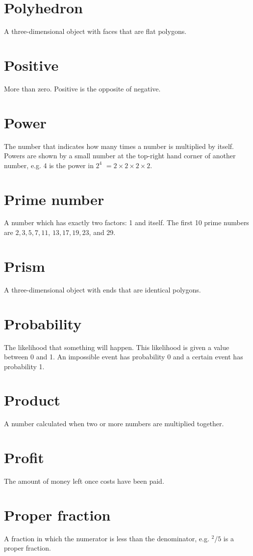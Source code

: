 \documentclass[10pt]{article}
\begin{document}
\section*{Polyhedron}
A three-dimensional object with faces that are flat polygons.

\section*{Positive}
More than zero. Positive is the opposite of negative.

\section*{Power}
The number that indicates how many times a number is multiplied by itself. Powers are shown by a small number at the top-right hand corner of another number, e.g. 4 is the power in $2^{4}$ $=2 \times 2 \times 2 \times 2$.

\section*{Prime number}
A number which has exactly two factors: 1 and itself. The first 10 prime numbers are $2,3,5,7,11$, $13,17,19,23$, and 29.

\section*{Prism}
A three-dimensional object with ends that are identical polygons.

\section*{Probability}
The likelihood that something will happen. This likelihood is given a value between 0 and 1. An impossible event has probability 0 and a certain event has probability 1.

\section*{Product}
A number calculated when two or more numbers are multiplied together.

\section*{Profit}
The amount of money left once costs have been paid.

\section*{Proper fraction}
A fraction in which the numerator is less than the denominator, e.g. ${ }^{2} / 5$ is a proper fraction.
\end{document}
